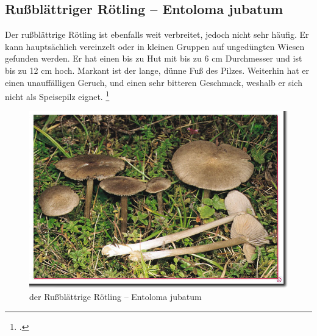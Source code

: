 \documentclass[a4paper,abstracton]{scrreprt}
\begin{document}
\subsection{Rußblättriger Rötling -- Entoloma jubatum}
Der rußblättrige Rötling ist ebenfalls weit verbreitet, jedoch nicht sehr häufig. Er kann hauptsächlich vereinzelt oder in kleinen Gruppen auf ungedüngten Wiesen gefunden werden. Er hat einen bis zu Hut mit bis zu 6 cm Durchmesser und ist bis zu 12 cm hoch. Markant ist der lange, dünne Fuß des Pilzes. Weiterhin hat er einen unauffälligen Geruch, und einen sehr bitteren Geschmack, weshalb er sich nicht als Speisepilz eignet.
\footcite{russblaettrig}
\begin{figure}[H]
\centering
\includegraphics[scale=0.3]{russblaettrig}
\caption{der Rußblättrige Rötling -- Entoloma jubatum }
\label{fig:russblaettrig}
\end{figure}
\end{document}
